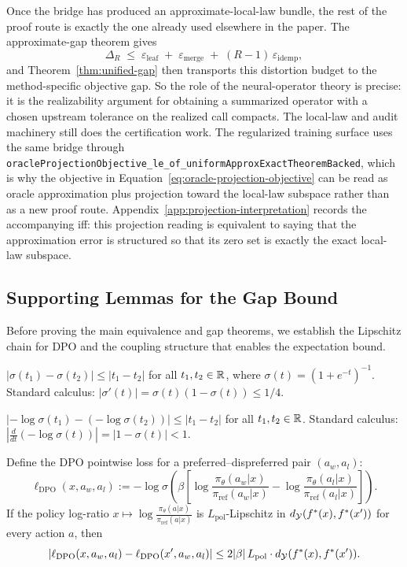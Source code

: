 Once the bridge has produced an approximate-local-law bundle, the rest
of the proof route is exactly the one already used elsewhere in the
paper. The approximate-gap theorem gives
\[
\Delta_R \;\le\;
\varepsilon_{\mathrm{leaf}}
\;+\;
\varepsilon_{\mathrm{merge}}
\;+\;
(R-1)\,\varepsilon_{\mathrm{idemp}},
\]
and Theorem~\ref{thm:unified-gap} then transports this distortion budget to
the method-specific objective gap. So the role of the neural-operator theory
is precise: it is the realizability argument for obtaining a summarized
operator with a chosen upstream tolerance on the realized call compacts.
The local-law and audit machinery still does the certification work.
The regularized training surface uses the same bridge through
\texttt{oracleProjectionObjective\_le\_of\_uniformApproxExactTheoremBacked},
which is why the objective in Equation~\eqref{eq:oracle-projection-objective}
can be read as oracle approximation plus projection toward the local-law
subspace rather than as a new proof route. Appendix~\ref{app:projection-interpretation}
records the accompanying iff: this projection reading is equivalent to
saying that the approximation error is structured so that its zero set is
exactly the exact local-law subspace.

\subsection{Supporting Lemmas for the Gap Bound}\label{app:supporting-lemmas}

Before proving the main equivalence and gap theorems, we establish the Lipschitz chain for DPO and the coupling structure that enables the expectation bound.

\begin{lemma}\label{lem:sigmoid-lip}
$|\sigma(t_1) - \sigma(t_2)| \le |t_1 - t_2|$ for all $t_1, t_2 \in \mathbb{R}$, where $\sigma(t) = (1 + e^{-t})^{-1}$. Standard calculus: $|\sigma'(t)| = \sigma(t)(1-\sigma(t)) \le 1/4$.
\end{lemma}

\begin{lemma}\label{lem:neglogsig-lip}
$|{-}\log\sigma(t_1) - ({-}\log\sigma(t_2))| \le |t_1 - t_2|$ for all $t_1, t_2 \in \mathbb{R}$. Standard calculus: $|\frac{d}{dt}(-\log\sigma(t))| = |1 - \sigma(t)| < 1$.
\end{lemma}

\begin{lemma}\label{lem:dpo-lip}
Define the DPO pointwise loss for a preferred--dispreferred pair $(a_w, a_l)$:
\[
\ell_{\mathrm{DPO}}(x, a_w, a_l) := -\log\sigma\!\left(\beta\left[\log\frac{\pi_\theta(a_w|x)}{\pi_{\mathrm{ref}}(a_w|x)} - \log\frac{\pi_\theta(a_l|x)}{\pi_{\mathrm{ref}}(a_l|x)}\right]\right).
\]
If the policy log-ratio $x \mapsto \log\frac{\pi_\theta(a|x)}{\pi_{\mathrm{ref}}(a|x)}$ is $L_{\mathrm{pol}}$-Lipschitz in $d_{\mathcal{Y}}(f^\ast(x), f^\ast(x'))$ for every action $a$, then
\[
|\ell_{\mathrm{DPO}}(x, a_w, a_l) - \ell_{\mathrm{DPO}}(x', a_w, a_l)| \le 2|\beta|\, L_{\mathrm{pol}} \cdot d_{\mathcal{Y}}(f^\ast(x), f^\ast(x')).
\]
\end{lemma}

